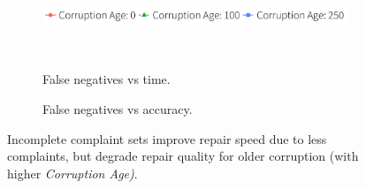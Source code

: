 \begin{figure}[t]
\begin{minipage}{.49\textwidth}
\begin{subfigure}[t]{.99\textwidth}
           \centering
      \includegraphics[width = .79\columnwidth]{figures/noise_legend} 
      \vspace*{-.1in}
    \end{subfigure} \\
      \begin{subfigure}[t]{.39\textwidth}
      \vspace*{-.1in}
      \caption{False negatives vs time.}
      \label{f:falsenegative_time} 
    \end{subfigure}
    \begin{subfigure}[t]{.59\textwidth}
      \vspace*{-.1in}
      \caption{False negatives vs accuracy.}
      \label{f:falsenegative_acc} 
    \end{subfigure}
    
    \vspace*{-.1in}
    \caption{Incomplete complaint sets improve repair speed due to less complaints, but degrade repair quality for older corruption (with higher \textit{Corruption Age)}. }
     \label{f:falsenegative} 
  \end{minipage}
  \end{figure}

